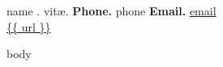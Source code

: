 \documentclass[letter]{article}
\begin{document}
{\huge {{ name }}. vit\ae.} \hfill {\small {\bf Phone.} {{ phone }}
{\bf Email.} \href{mailto: {{ email }} }{ {{email }} }} \\
\url{ {{ url }} }
\vspace{3mm}

{{ body }}
\end{document}
